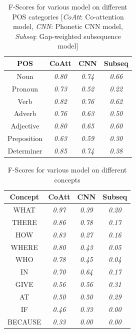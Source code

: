 \documentclass[11pt,letterpaper]{article}
\begin{document}
\begin{table}[h]
\centering
\begin{tabular}{cccc}
\textbf{POS} & \textbf{CoAtt} & \textbf{CNN} & \textbf{Subseq} \\ \hline
Noun             & \textit{0.80}  & \textit{0.74}  & \textit{0.66}   \\
Pronoun          & \textit{0.73}  & \textit{0.52}  & \textit{0.22}   \\
Verb             & \textit{0.82}  & \textit{0.76}  & \textit{0.62}   \\
Adverb           & \textit{0.76}  & \textit{0.63}  & \textit{0.50}   \\
Adjective        & \textit{0.80}  & \textit{0.65}  & \textit{0.60}   \\
Preposition      & \textit{0.63}  & \textit{0.59}  & \textit{0.30}   \\
Determiner       & \textit{0.85}  & \textit{0.74}  & \textit{0.38}   
\end{tabular}
\caption{F-Scores for various model on different POS categories [\textit{CoAtt}: Co-attention model, \textit{CNN}: Phonetic CNN model, \textit{Subseq}: Gap-weighted subsequence model] }
\end{table}

\begin{table}[h]
\centering
\begin{tabular}{cccc}
\textbf{Concept} & \textbf{CoAtt} & \textbf{CNN} & \textbf{Subseq} \\ \hline
WHAT             & \textit{0.97}  & \textit{0.39}  & \textit{0.20}   \\
THERE            & \textit{0.86}  & \textit{0.78}  & \textit{0.17}   \\
HOW              & \textit{0.83}  & \textit{0.27}  & \textit{0.16}   \\
WHERE            & \textit{0.80}  & \textit{0.43}  & \textit{0.05}   \\
WHO              & \textit{0.78}  & \textit{0.45}  & \textit{0.04}   \\
IN               & \textit{0.70}  & \textit{0.64}  & \textit{0.17}   \\
GIVE             & \textit{0.56}  & \textit{0.56}  & \textit{0.31}   \\
AT               & \textit{0.50}  & \textit{0.50}  & \textit{0.29}   \\
IF               & \textit{0.46}  & \textit{0.33}  & \textit{0.00}   \\
BECAUSE          & \textit{0.33}  & \textit{0.00}  & \textit{0.00}   
\end{tabular}
\caption{F-Scores for various model on different concepts  }
\end{table}
\end{document}
